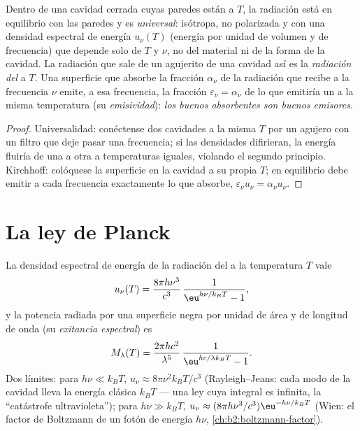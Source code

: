 \begin{proposition}\label{prop:b2:thermal-radiation:kirchhoff}
Dentro de una cavidad cerrada cuyas paredes están a $T$, la radiación está en
equilibrio con las paredes y es \emph{universal}: isótropa,
no polarizada y con una densidad espectral de energía $u_\nu(T)$ (energía por unidad de
volumen y de frecuencia) que depende solo de $T$ y $\nu$, no del
material ni de la forma de la cavidad. La radiación que sale de un agujerito de
una cavidad así es la \emph{radiación del } a $T$. Una superficie que
absorbe la fracción $\alpha_\nu$ de la radiación que recibe a la
frecuencia $\nu$ emite, a esa frecuencia, la fracción
$\varepsilon_\nu = \alpha_\nu$ de lo que emitiría un  a la misma
temperatura (su \emph{emisividad}):
\emph{los buenos absorbentes son buenos emisores}.
\end{proposition}

\begin{proof}
Universalidad: conéctense dos cavidades a la misma $T$ por un agujero con un
filtro que deje pasar una frecuencia; si las densidades difirieran, la energía
fluiría de una a otra a temperaturas iguales, violando el segundo
principio. Kirchhoff: colóquese la superficie en la cavidad a su propia $T$; en
equilibrio debe emitir a cada frecuencia exactamente lo que absorbe,
$\varepsilon_\nu u_\nu = \alpha_\nu u_\nu$.
\end{proof}

\section{La ley de Planck}

\begin{theorem}\label{thm:b2:thermal-radiation:planck}
La densidad espectral de energía de la radiación del  a la temperatura
$T$ vale
\[
u_\nu(T) = \frac{8\pi h\nu^3}{c^3}\,\frac{1}{\eu^{h\nu/k_BT} - 1},
\]
y la potencia radiada por una superficie negra por unidad de área y de
longitud de onda (su \emph{exitancia espectral}) es
\[
M_\lambda(T) = \frac{2\pi hc^2}{\lambda^5}\,\frac{1}{\eu^{hc/\lambda k_BT} - 1}.
\]
Dos límites: para $h\nu \ll k_BT$, $u_\nu \approx 8\pi\nu^2 k_BT/c^3$
(Rayleigh--Jeans: cada modo de la cavidad lleva la energía clásica
$k_BT$ --- una ley cuya integral es infinita, la ``catástrofe
ultravioleta''); para $h\nu \gg k_BT$, $u_\nu \approx (8\pi h\nu^3/c^3)
\eu^{-h\nu/k_BT}$ (Wien: el factor de Boltzmann de un fotón de energía
$h\nu$, \cref{ch:b2:boltzmann-factor}).
\end{theorem}

